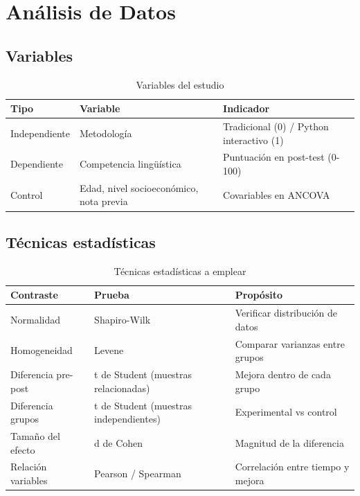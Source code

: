 \documentclass[12pt,spanish]{article}
\begin{document}
\newpage
\section{Análisis de Datos}

\subsection{Variables}

\begin{table}[H]
\centering
\caption{Variables del estudio}
\label{tab:variables}
\begin{tabular}{|p{3cm}|p{4cm}|p{6cm}|}
\hline
\textbf{Tipo} & \textbf{Variable} & \textbf{Indicador} \\
\hline
Independiente & Metodología & Tradicional (0) / Python interactivo (1) \\
\hline
Dependiente & Competencia lingüística & Puntuación en post-test (0-100) \\
\hline
Control & Edad, nivel socioeconómico, nota previa & Covariables en ANCOVA \\
\hline
\end{tabular}
\end{table}

\subsection{Técnicas estadísticas}

\begin{table}[H]
\centering
\caption{Técnicas estadísticas a emplear}
\label{tab:estadisticas}
\begin{tabular}{|p{4cm}|p{4cm}|p{5cm}|}
\hline
\textbf{Contraste} & \textbf{Prueba} & \textbf{Propósito} \\
\hline
Normalidad & Shapiro-Wilk & Verificar distribución de datos \\
\hline
Homogeneidad & Levene & Comparar varianzas entre grupos \\
\hline
Diferencia pre-post & t de Student (muestras relacionadas) & Mejora dentro de cada grupo \\
\hline
Diferencia grupos & t de Student (muestras independientes) & Experimental vs control \\
\hline
Tamaño del efecto & d de Cohen & Magnitud de la diferencia \\
\hline
Relación variables & Pearson / Spearman & Correlación entre tiempo y mejora \\
\hline
\end{tabular}
\end{table}
\end{document}
